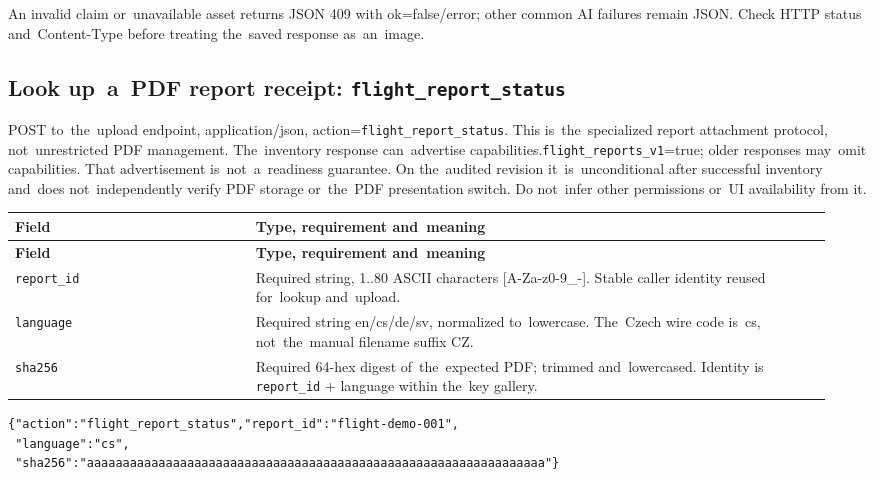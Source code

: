 \documentclass[11pt,a4paper]{article}
\newcommand{\codeword}[1]{\nolinkurl{#1}}
\begin{document}
An invalid claim or~unavailable asset returns JSON 409 with ok=false/error; other common AI
failures remain JSON. Check HTTP status and~Content-Type before treating the~saved response
as~an~image.

\subsection{\texorpdfstring{Look up~a~PDF report receipt: \codeword{flight_report_status}}{Look up a PDF report receipt: flight\_report\_status}}

\label{api352:flight-report-status}

POST to~the~upload endpoint, application/json, action=\codeword{flight_report_status}. This
is~the~specialized report attachment protocol, not~unrestricted PDF management.
The~inventory response can~advertise capabilities.\codeword{flight_reports_v1}=true; older
responses may~omit capabilities. That advertisement is~not~a~readiness guarantee. On
the~audited revision it~is~unconditional after successful inventory and~does
not~independently verify PDF storage or~the~PDF presentation switch. Do not~infer other
permissions or~UI availability from it.

\begin{longtable}{@{}>{\RaggedRight\arraybackslash}p{0.28\linewidth}>{\RaggedRight\arraybackslash}p{0.67\linewidth}@{}}
\toprule
\textbf{Field} & \textbf{Type, requirement and~meaning} \\
\midrule
\endfirsthead
\toprule
\textbf{Field} & \textbf{Type, requirement and~meaning} \\
\midrule
\endhead
\bottomrule
\endfoot
\codeword{report_id} & Required string, 1..80 ASCII characters [A-Za-z0-9\_-]. Stable caller
identity reused for~lookup and~upload. \\
\codeword{language} & Required string en/cs/de/sv, normalized to~lowercase. The~Czech wire
code is~cs, not~the~manual filename suffix CZ. \\
\codeword{sha256} & Required 64-hex digest of~the~expected PDF; trimmed and~lowercased.
Identity is \codeword{report_id} + language within the~key gallery. \\
\end{longtable}

\begin{lstlisting}[language={}]
{"action":"flight_report_status","report_id":"flight-demo-001",
 "language":"cs",
 "sha256":"aaaaaaaaaaaaaaaaaaaaaaaaaaaaaaaaaaaaaaaaaaaaaaaaaaaaaaaaaaaaaaaa"}
\end{lstlisting}
\end{document}

